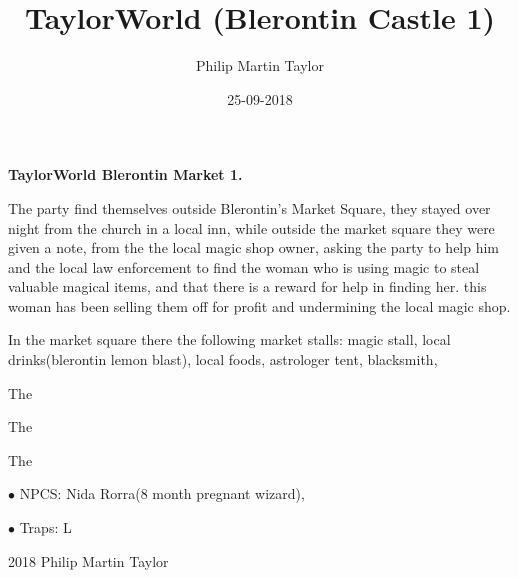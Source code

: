 \documentclass[12pt,a4paper]{book}
\date{25-09-2018}
\author{Philip Martin Taylor}
\title{TaylorWorld (Blerontin Castle 1)}
\begin{document}
\begin{center}
\textbf{TaylorWorld\texttrademark \: Blerontin Market 1.}
\end{center}
\begin{flushleft}
  The party find themselves outside Blerontin's Market Square, they stayed over night from the church in a local inn, while outside the market square they were given a note, from the the local magic shop owner, asking the party to help him and the local law enforcement to find the woman who is using magic to steal valuable magical items, and that there is a reward for help in finding her. this woman has been selling them off for profit and undermining the local magic shop. 
\end{flushleft}
\begin{flushleft}
  In the market square there the following market stalls: magic stall, local drinks(blerontin lemon blast), local foods, astrologer tent, blacksmith, 
\end{flushleft}
\begin{flushleft}
  The
\end{flushleft}
\begin{flushleft}
  The
\end{flushleft}
\begin{flushleft}
  The
\end{flushleft}
\begin{flushleft}
\item[$\bullet$ NPCS:] Nida Rorra(8 month pregnant wizard),
  \item[$\bullet$ Traps:] L
\end{flushleft}
\begin{center}
  \textcopyright{} 2018 Philip Martin Taylor
\end{center}
\end{document}
